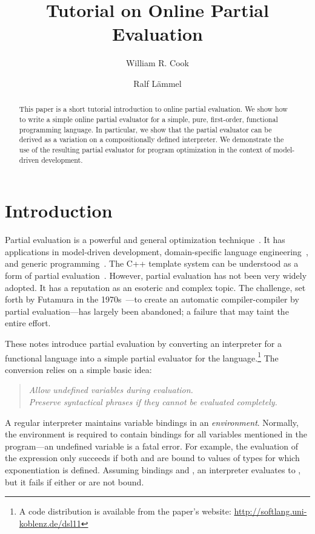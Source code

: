 \documentclass{eptcs}
\title{Tutorial on Online Partial Evaluation}
\author{William R. Cook
       \institute{Department of Computer Science, University of Texas
             at Austin, USA}
       \and Ralf L\"ammel 
       \institute{Department of Computer Science, University of
            Koblenz-Landau, Germany}
         }
\begin{document}
\maketitle

\begin{abstract}
  This paper is a short tutorial introduction to online partial
  evaluation. We show how to write a simple online partial evaluator
  for a simple, pure, first-order, functional programming language.
  In particular, we show that the partial evaluator can be derived as
  a variation on a compositionally defined interpreter. We demonstrate
  the use of the resulting partial evaluator for program optimization
  in the context of model-driven development.



\end{abstract}



\section{Introduction}

Partial evaluation is a powerful and general optimization technique~\cite{PartialEvalBookGomard}.
It has applications in model-driven development, domain-specific
language engineering~\cite{Hudak:1998:MDS:551789.853532}, 
and generic programming~\cite{Landauer:1999:GPP:874070.876061}.
The C++ template system can be understood as a form of partial
evaluation~\cite{Veldhuizen1998}. 
However, partial evaluation has not been very widely adopted.  It has
a reputation as an esoteric and complex topic. The challenge, set
forth by Futamura in the 1970s~\cite{Futamura+71}---to create an automatic
compiler-compiler by partial evaluation---has largely been abandoned; a
failure that may taint the entire effort.

These notes introduce partial evaluation by converting an interpreter
for a functional language into a simple partial evaluator for the
language.\footnote{A code distribution is available from the paper's
  website: \url{http://softlang.uni-koblenz.de/dsl11}} The conversion relies on a simple basic idea: 

\begin{quote}\itshape\centering
Allow undefined variables during evaluation.\\
Preserve syntactical phrases if they cannot be evaluated completely.
\end{quote}

\noindent
A regular interpreter maintains variable bindings in an
\textit{environment}.  Normally, the environment is required to
contain bindings for all variables mentioned in the program---an
undefined variable is a fatal error. For example, the evaluation of
the expression  only succeeds if both  and  are bound to
values of types for which exponentiation is defined. Assuming bindings
 and , an interpreter evaluates  to , but it fails
if either  or  are not bound.
\end{document}
